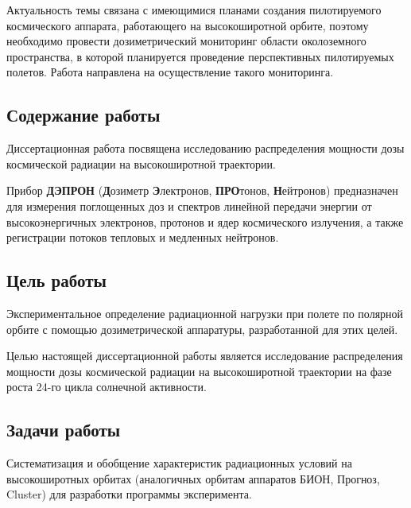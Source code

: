 \documentclass[a4paper,portrait,12pt]{article}
\begin{document}
\hypertarget{OLE_LINK71}{\hypertarget{OLE_LINK70}{\hypertarget{OLE_LINK64}{\hypertarget{OLE_LINK63}{Актуальность темы связана с имеющимися планами создания пилотируемого космического аппарата, работающего на высокоширотной орбите, поэтому необходимо провести дозиметрический мониторинг области околоземного пространства, в которой планируется проведение перспективных пилотируемых полетов. Работа направлена на осуществление такого мониторинга.}}


\subsection*{\textbf{Содержание работы}}

\hypertarget{OLE_LINK72}{\hypertarget{OLE_LINK66}{\hypertarget{OLE_LINK65}{\hypertarget{OLE_LINK73}{Диссертационная работа посвящена исследованию распределения мощности дозы космической радиации на высокоширотной траектории.}} 


Прибор \textbf{ДЭПРОН} (\textbf{Д}озиметр \textbf{Э}лектронов, \textbf{ПРО}тонов, \textbf{Н}ейтронов) предназначен для измерения поглощенных доз и спектров линейной передачи энергии от высокоэнергичных электронов, протонов и ядер космического излучения, а также регистрации потоков тепловых и медленных нейтронов.


\subsection*{\textbf{Цель работы}}

\hypertarget{OLE_LINK67}{Экспериментальное определение радиационной нагрузки при полете по полярной орбите с помощью дозиметрической аппаратуры, разработанной для этих целей. 


\colorbox[rgb]{1.000,1.000,0.000}{Целью настоящей диссертационной работы является }\hypertarget{OLE_LINK68}{\hypertarget{OLE_LINK69}{\colorbox[rgb]{1.000,1.000,0.000}{исследование распределения мощности дозы космической радиации на высокоширотной траектории на фазе роста 24-го цикла солнечной активности}.}}}


\subsection*{\textbf{Задачи работы}}

Систематизация и обобщение характеристик радиационных условий на высокоширотных орбитах (аналогичных орбитам аппаратов БИОН, Прогноз, Cluster) для разработки программы эксперимента.


}}}}
\end{document}
